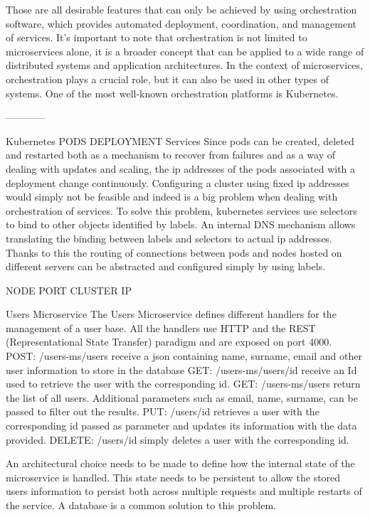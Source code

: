\documentclass[sigplan,screen]{acmart}
\begin{document}
Those are all desirable features that can only be achieved by using orchestration software, which provides automated deployment, coordination, and management of services. It's important to note that orchestration is not limited to microservices alone, it is a broader concept that can be applied to a wide range of distributed systems and application architectures. In the context of microservices, orchestration plays a crucial role, but it can also be used in other types of systems. One of the most well-known orchestration platforms is Kubernetes.

—---------



Kubernetes
PODS
DEPLOYMENT
Services
Since pods can be created, deleted and restarted both as a mechanism to recover from failures and as a way of dealing with updates and scaling, the ip addresses of the pods associated with a deployment change continuously. Configuring a cluster using fixed ip addresses would simply not be feasible and indeed is a big problem when dealing with orchestration of services. To solve this problem, kubernetes services use selectors to bind to other objects identified by labels. An internal DNS mechanism allows translating the binding between labels and selectors to actual ip addresses. Thanks to this the routing of connections between pods and nodes hosted on different servers can be abstracted and configured simply by using labels.

NODE PORT
CLUSTER IP

Users Microservice
The Users Microservice defines different handlers for the management of a user base. All the handlers use HTTP and the REST (Representational State Transfer) paradigm and are exposed on port 4000.
POST: /users-ms/users receive a json containing name, surname, email and other user information to store in the database
GET: /users-ms/users/{id} receive an Id used to retrieve the user with the corresponding id.
GET: /users-ms/users return the list of all users. Additional parameters such as email, name, surname, can be passed to filter out the results.
PUT: /users/{id} retrieves a user with the corresponding id passed as parameter and updates its information with the data provided.
DELETE: /users/{id} simply deletes a user with the corresponding id.

An architectural choice needs to be made to define how the internal state of the microservice is handled. This state needs to be persistent to allow the stored users information to persist both across multiple requests and multiple restarts of the service. A database is a common solution to this problem.
\end{document}
